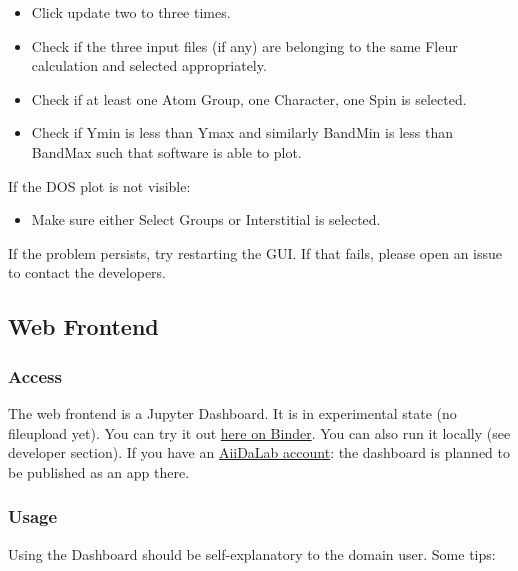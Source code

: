 \begin{itemize}
    \tightlist
\item
    Click update two to three times.
\item
    Check if the three input files (if any) are belonging to the same
    Fleur calculation and selected appropriately.
\item
    Check if at least one Atom Group, one Character, one Spin is selected.
\item
    Check if Ymin is less than Ymax and similarly BandMin is less than
    BandMax such that software is able to plot.
\end{itemize}

If the DOS plot is not visible:

\begin{itemize}
    \tightlist
\item Make sure either Select Groups or Interstitial is selected.
\end{itemize}

If the problem persists, try restarting the GUI. If that fails, please open an
issue to contact the developers.

\subsection{Web Frontend}\label{web-frontend}

\subsubsection{Access}\label{access}

The web frontend is a Jupyter Dashboard. It is in experimental state (no
fileupload yet). You can try it out
\href{https://mybinder.org/v2/gh/JuDFTteam/masci-tools/studentproject18ws?filepath=studentproject18w\%2Ffrontend\%2Fjupyter\%2Fdemo\%2Fbinder_demo.ipynb}{here
  on Binder}. You can also run it locally (see developer section). If you have an
\href{https://aiidalab.materialscloud.org/hub/login}{AiiDaLab account}: the
dashboard is planned to be published as an app there.

\subsubsection{Usage}\label{usage-1}

Using the Dashboard should be self-explanatory to the domain user. Some
tips:

